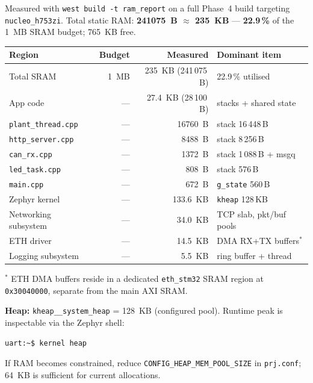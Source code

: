 \documentclass[11pt,a4paper]{article}
\begin{document}
Measured with \texttt{west build -t ram\_report} on a full Phase~4 build
targeting \texttt{nucleo\_h753zi}.
Total static RAM: \textbf{\SI{241075}{B} $\approx$ \SI{235}{KB}}
--- \textbf{22.9\,\%} of the \SI{1}{MB} SRAM budget; \SI{765}{KB} free.

\begin{center}
\begin{tabular}{lrrl}
\toprule
Region & Budget & Measured & Dominant item \\
\midrule
Total SRAM & \SI{1}{MB} & \SI{235}{KB} (241\,075\,B) & 22.9\,\% utilised \\
\addlinespace
App code & --- & \SI{27.4}{KB} (28\,100\,B) & stacks + shared state \\
\quad \texttt{plant\_thread.cpp} & --- & \SI{16760}{B} & stack 16\,448\,B \\
\quad \texttt{http\_server.cpp} & --- & \SI{8488}{B} & stack 8\,256\,B \\
\quad \texttt{can\_rx.cpp} & --- & \SI{1372}{B} & stack 1\,088\,B + msgq \\
\quad \texttt{led\_task.cpp} & --- & \SI{808}{B} & stack 576\,B \\
\quad \texttt{main.cpp} & --- & \SI{672}{B} & \texttt{g\_state} 560\,B \\
\addlinespace
Zephyr kernel & --- & \SI{133.6}{KB} & \texttt{kheap} 128\,KB \\
Networking subsystem & --- & \SI{34.0}{KB} & TCP slab, pkt/buf pools \\
ETH driver & --- & \SI{14.5}{KB} & DMA RX+TX buffers$^*$ \\
Logging subsystem & --- & \SI{5.5}{KB} & ring buffer + thread \\
\bottomrule
\end{tabular}
\end{center}

\noindent $^*$ ETH DMA buffers reside in a dedicated \texttt{eth\_stm32} SRAM
region at \texttt{0x30040000}, separate from the main AXI SRAM.

\medskip
\noindent\textbf{Heap:} \texttt{kheap\_\_system\_heap} = \SI{128}{KB}
(configured pool). Runtime peak is inspectable via the Zephyr shell:

\begin{lstlisting}[language=bash]
uart:~$ kernel heap
\end{lstlisting}

\noindent If RAM becomes constrained, reduce \texttt{CONFIG\_HEAP\_MEM\_POOL\_SIZE}
in \texttt{prj.conf}; \SI{64}{KB} is sufficient for current allocations.
\end{document}
